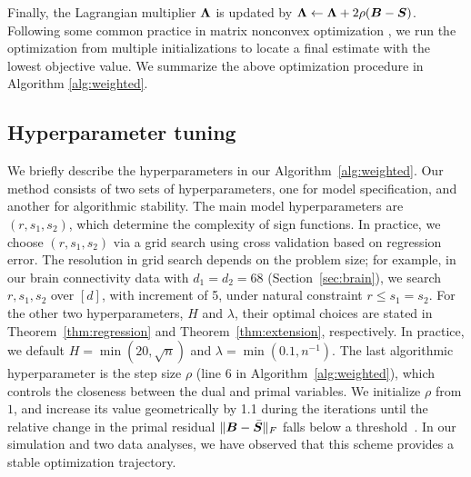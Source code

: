 \documentclass[aos]{imsart}
\theoremstyle{definition}
\begin{document}
Finally, the Lagrangian multiplier $\bm{\Lambda}$ is updated by $\bm{\Lambda}\leftarrow\bm{\Lambda}+2\rho(\bm B-\bm S)$. Following some common practice in matrix nonconvex optimization \citep{yang2016rate}, we run the optimization from multiple initializations to locate a final estimate with the lowest objective value. We summarize the above optimization procedure in Algorithm \ref{alg:weighted}. 


\subsection{Hyperparameter tuning}
We briefly describe the hyperparameters in our Algorithm~\ref{alg:weighted}. Our method consists of two sets of hyperparameters, one for model specification, and another for algorithmic stability. The main model hyperparameters are $(r,s_1,s_2)$, which determine the complexity of sign functions. In practice, we choose $(r,s_1,s_2)$ via a grid search using cross validation based on regression error. The  resolution in grid search depends on the problem size; for example, in our brain connectivity data with $d_1=d_2=68$ (Section~\ref{sec:brain}), we search $r, s_1,s_2$ over $[d]$, with increment of 5, under natural constraint $r\leq s_1=s_2$. For the other two hyperparameters, $H$ and $\lambda$, their optimal choices are stated in Theorem~\ref{thm:regression} and Theorem~\ref{thm:extension}, respectively. In practice, we default $H=\min(20, \sqrt{n})$ and $\lambda=\min(0.1,n^{-1})$. The last algorithmic hyperparameter is the step size $\rho$ (line 6 in Algorithm~\ref{alg:weighted}), which controls the closeness between the dual and primal variables. We initialize $\rho$ from $1$, and increase its value geometrically by 1.1 during the iterations until the relative change in the primal residual $\lVert\bm B-\bar {\bm S}\rVert_F$ falls below a threshold~\cite{parikh2014proximal}. In our simulation and two data analyses, we have observed that this scheme provides a stable optimization trajectory. 
\end{document}
